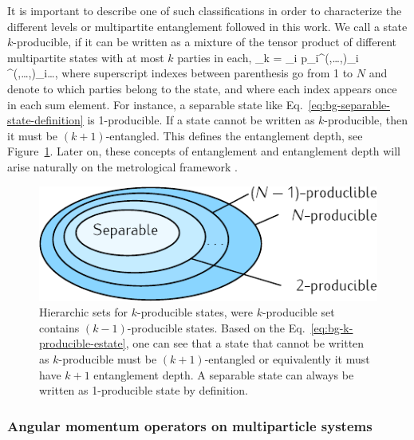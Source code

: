 It is important to describe one of such classifications in order to characterize the different levels or multipartite entanglement followed in this work.
We call a state $k$-producible, if it can be written as a mixture of the tensor product of different multipartite states with at most $k$ parties in each,
\be
  \label{eq:bg-k-producible-estate}
  \rho_{k} = \sum_i p_i\rho^{(\alpha,\dots,\beta)}_i \otimes \rho^{(\gamma,\dots,\delta)}_i\otimes \dots,
\ee
where superscript indexes between parenthesis go from 1 to $N$ and denote to which parties belong to the state, and where each index appears once in each sum element.
For instance, a separable state like Eq.~\eqref{eq:bg-separable-state-definition} is 1-producible.
If a state cannot be written as $k$-producible, then it must be $(k{+}1)$-entangled.
This defines the entanglement depth, see Figure~\ref{fig:bg-separability-k-producibility-circle}.
Later on, these concepts of entanglement and entanglement depth will arise naturally on the metrological framework \cite{Toth2014}.
\begin{figure}[htp]
  \centering
  \includegraphics[scale=1.2]{img/BG_separability_k_producibility_circle.pdf}
  \caption[Diagram for $k$-producible sets]{
  Hierarchic sets for $k$-producible states, were $k$-producible set contains $(k{-}1)$-producible states.
  Based on the Eq.~\eqref{eq:bg-k-producible-estate}, one can see that a state that cannot be written as $k$-producible must be $(k{+}1)$-entangled or equivalently it must have $k{+}1$ entanglement depth.
  A separable state can always be written as 1-producible state by definition.}
  \label{fig:bg-separability-k-producibility-circle}
\end{figure}

\subsubsection{Angular momentum operators on multiparticle systems}
\label{sec:bg-angular-momentum-operators}


